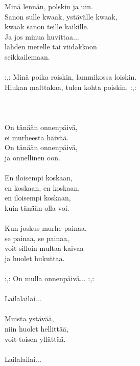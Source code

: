 
Minä lennän, polskin ja uin. \\ Sanon sulle kwaak, ystävälle kwaak, \\ kwaak sanon teille kaikille. \\ Ja jos minua huvittaa... \\ lähden merelle tai viidakkoon \\ seikkailemaan. \\ \hspace{10mm} \\ :,: Minä poika roiskin, lammikossa loiskin. \\ Hiukan malttakaa, tulen kohta poiskin. :,: \\ \hspace{10mm} \\ [lallatusta] \\ \hspace{10mm} \\ On tänään onnenpäivä, \\ ei murheesta häivää. \\ On tänään onnenpäivä, \\ ja onnellinen oon. \\ \hspace{10mm} \\ En iloisempi koskaan, \\ en koskaan, en koskaan, \\ en iloisempi koskaan, \\ kuin tänään olla voi. \\ \hspace{10mm} \\ Kun joskus murhe painaa, \\ se painaa, se painaa, \\ voit silloin multaa kaivaa \\ ja huolet hukuttaa. \\ \hspace{10mm} \\ :,: On mulla onnenpäivä... :,: \\ \hspace{10mm} \\ Lailalailai... \\ \hspace{10mm} \\ Muista ystävää, \\ niin huolet hellittää, \\ voit toisen yllättää. \\ \hspace{10mm} \\ Lailalailai...